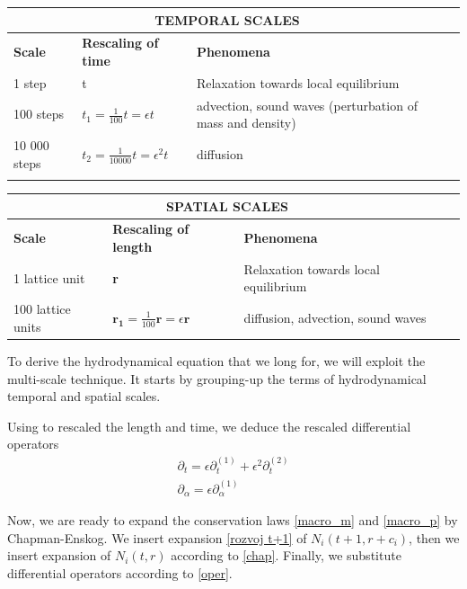 \begin{center} 
    \begin{tabular}{| l | l | l | l |}
    \hline
    \multicolumn{3}{|c|}{ \label{scalings} TEMPORAL SCALES}\\ \hline
    \textbf{Scale} & \textbf{Rescaling of time} & \textbf{Phenomena} \\ \hline
    1 step & t & Relaxation towards local equilibrium \\ \hline
    100 steps & $t_1 = \frac{1}{100} t = \epsilon t$ & advection, sound waves (perturbation of mass and density) \\ \hline
    10 000 steps & $t_2 = \frac{1}{10000} t = \epsilon^2 t$ & diffusion \\ \hline
    \label{scalings}
    \end{tabular}
\end{center}


\begin{center}
    \begin{tabular}{| l | l | l | l |}
    \hline
    \multicolumn{3}{|c|}{SPATIAL SCALES}\\ \hline
    \textbf{Scale} & \textbf{Rescaling of length} & \textbf{Phenomena} \\ \hline
    1 lattice unit & \textbf{r} & Relaxation towards local equilibrium \\ \hline
    100 lattice units & $\bm{r_1} = \frac{1}{100} \bm{r} = \epsilon \bm{r}$ & diffusion, advection, sound waves\\ \hline
    \end{tabular}
\end{center}

To derive the hydrodynamical equation that we long for, we will exploit the multi-scale technique. It starts by grouping-up the terms of hydrodynamical temporal and spatial scales.


\bigskip
Using to rescaled the length and time, we deduce the rescaled differential operators
\begin{equation} \label{oper}
\begin{split}
\partial_t = \epsilon \partial_t^{(1)} + \epsilon^2 \partial_t^{(2)} \\
\partial_{\alpha} = \epsilon \partial_{\alpha}^{(1)}
\end{split}
\end{equation}

Now, we are ready to expand the conservation laws \ref{macro_m} and \ref{macro_p} by Chapman-Enskog. We insert expansion \ref{rozvoj t+1} of $N_i(t+1,r+c_i)$, then we insert expansion of $N_i(t,r)$ according to \ref{chap}. Finally, we substitute differential operators according to \ref{oper}.

